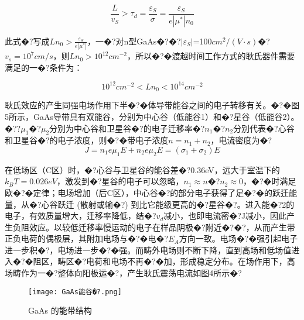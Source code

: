 \documentclass{zjureport}
\begin{document}
 \begin{equation}
 	\frac{L}{v_{S}}>\tau_{d}=\frac{\varepsilon_{S}}{\sigma}=\frac{\varepsilon_{S}}{e\left|\mu^{*}\right|n_{0}}
 \end{equation}
 
 此式�?写成$Ln_{0}>\frac{\varepsilon_{S}}{e\left|\mu^{*}\right|}$，一�?对n型GaAs�?�?$\left|\varepsilon_{S}\right|$=100$cm^{2}/(V·s)$�?$v_{s}=10^{7}cm/s$，则$Ln_{0}>10^{12}cm^{-2}$，所以�?�渡越时间工作方式的耿氏器件需要满足的一�?条件为：
 
 \begin{equation}
 	10^{12}cm^{-2}<Ln_{0}<10^{14}cm^{-2}
 \end{equation}
 
 耿氏效应的产生同强电场作用下半�?�体导带能谷之间的电子转移有关。�?�图5所示，GaAs导带具有双能谷，分别为中心谷（低能谷1）和�?星谷（低能谷2）。�??$\mu_{1}$�?$\mu_{2}$分别为中心谷和卫星谷�?的电子迁移率�?$n_{1}$�?$n_{2}$分别代表�?心谷和卫星谷�?的电子浓度，则�?�带电子浓度$n=n_{1}+n_{2}$，电流密度为�?
 \begin{equation}
 	J = n_{1}e\mu_{1}E+n_{2}e\mu_{2}E=(\sigma_{1}+\sigma_{2})E
 \end{equation}

在低场区（C区）时，�?心谷与卫星谷的能谷差�?0.36eV，远大于室温下的$k_{B}T=0.026eV$，激发到�?星谷的电子可以忽略，$n_{1}\approx n$�?$n_{2}\approx 0 $，�?�时满足欧�?�定律；电场增加（后C区），中心谷�?的部分电子获得了足�?�的跃迁能量，从�?心谷跃迁 (散射或输�?) 到比它能级更高的�?星谷�?。进入能�?2的电子，有效质量增大，迁移率降低，结�?$v_{d}$减小，也即电流密�?J减小，因此产生负阻效应。以较低迁移率慢运动的电子在样品阴极�?附近�?�?，从而产生带正负电荷的偶极层，其附加电场与�?�电�?$E_{A}$方向一致。电场�?�强引起电子进一步积�?，电场进一步�?�强。而畴外电场则不断下降，直到高场和低场值进入�?�阻区，畴区�?电荷和电场不再�?�加，形成稳定分布。在场作用下，高场畴作为一�?整体向阳极运�?，产生耿氏震荡电流如图4所示�?
 
 \begin{figure}[htbp]
 	\centering
 	\texttt{[image: GaAs能谷�?.png]}
 	\caption{GaAs 的能带结构}
 \end{figure}
 
\end{document}

